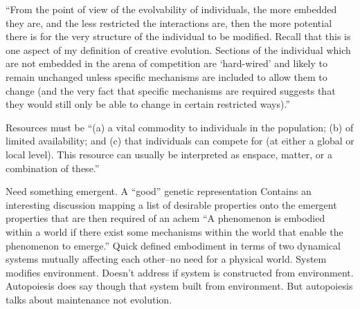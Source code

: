 \begin{NOTES}

``From the point of view of the evolvability of individuals, the more embedded they are, and the less restricted the interactions are, then the more potential there is for the very structure of the individual to be modified. Recall that this is one aspect of my definition of creative evolution. Sections of the individual which are not embedded in the arena of competition are `hard-wired' and likely to remain unchanged unless specific mechanisms are included to allow them to change (and the very fact that specific mechanisms are required suggests that they would still only be able to change in certain restricted ways).'' \cite{Taylor2001}

Resources must be ``(a) a vital commodity to individuals in the population; (b) of limited availability; and (c) that individuals can compete for (at either a global or local level). This resource can usually be interpreted as en\eg space, matter, or a combination of these.'' \parencite{Taylor2001}

Need something emergent. \parencite{Nellis2014}
A ``good'' genetic representation \parencite{Soros2014}
Contains an interesting discussion mapping a list of desirable properties onto the emergent properties that are then required of an \gls{achem} \parencite{Faulconbridge2010, Faulconbridge2011}
``A phenomenon is embodied within a world if there exist some mechanisms within the world that enable the phenomenon to emerge.'' \cite{Nellis2014}
Quick defined embodiment in terms of two dynamical systems mutually affecting each other--no need for a physical world. System modifies environment. Doesn't address if system is constructed from environment. Autopoiesis does say though that system built from environment. But autopoiesis talks about maintenance not evolution. \parencite{Nellis2014}


\end{NOTES}
